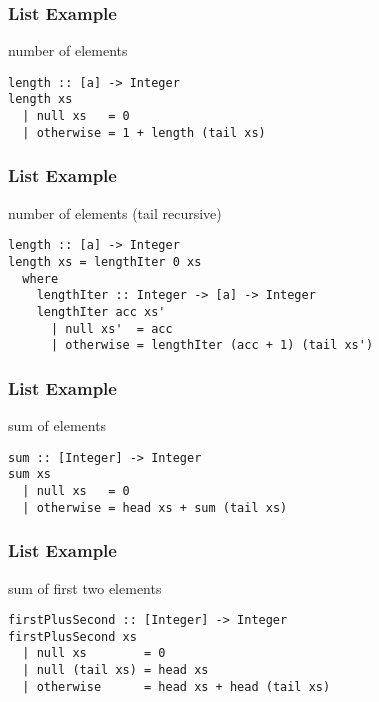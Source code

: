 \documentclass[dvipsnames]{beamer}
\theoremstyle{plain}
\begin{document}
\begin{frame}[fragile]
  \frametitle{List Example}

  \begin{exampleblock}{number of elements}
    \begin{lstlisting}[deletekeywords={length}]
length :: [a] -> Integer
length xs
  | null xs   = 0
  | otherwise = 1 + length (tail xs)
    \end{lstlisting}
  \end{exampleblock}
\end{frame}

\begin{frame}[fragile]
  \frametitle{List Example}

  \begin{exampleblock}{number of elements (tail recursive)}
    \begin{lstlisting}[deletekeywords={length}]
length :: [a] -> Integer
length xs = lengthIter 0 xs
  where
    lengthIter :: Integer -> [a] -> Integer
    lengthIter acc xs'
      | null xs'  = acc
      | otherwise = lengthIter (acc + 1) (tail xs')
    \end{lstlisting}
  \end{exampleblock}
\end{frame}

\begin{frame}[fragile]
  \frametitle{List Example}

  \begin{exampleblock}{sum of elements}
    \begin{lstlisting}[deletekeywords={sum}]
sum :: [Integer] -> Integer
sum xs
  | null xs   = 0
  | otherwise = head xs + sum (tail xs)
    \end{lstlisting}
  \end{exampleblock}
\end{frame}

\begin{frame}[fragile]
  \frametitle{List Example}

  \begin{exampleblock}{sum of first two elements}
    \begin{lstlisting}
firstPlusSecond :: [Integer] -> Integer
firstPlusSecond xs
  | null xs        = 0
  | null (tail xs) = head xs
  | otherwise      = head xs + head (tail xs)
    \end{lstlisting}
  \end{exampleblock}
\end{frame}
\end{document}
